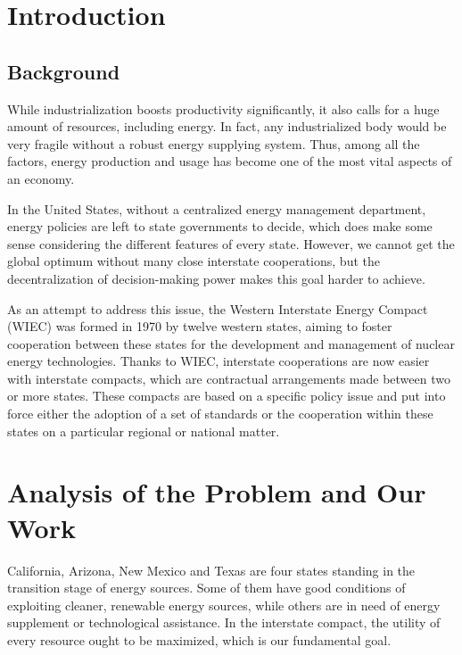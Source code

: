 \documentclass{mcmthesis}
\begin{document}
\section{Introduction}
\subsection{Background}
While industrialization boosts productivity significantly, it also calls for a huge amount of resources, including energy.
In fact, any industrialized body would be very fragile without a robust energy supplying system.
Thus, among all the factors, energy production and usage has become one of the most vital aspects of an economy.

In the United States, without a centralized energy management department, energy policies are left to state governments to decide, which does make some sense considering the different features of every state.
However, we cannot get the global optimum without many close interstate cooperations, but the decentralization of decision-making power makes this goal harder to achieve.

As an attempt to address this issue, the Western Interstate Energy Compact (WIEC) was formed in 1970 by twelve western states, aiming to foster cooperation between these states for the development and management of nuclear energy technologies.
Thanks to WIEC, interstate cooperations are now easier with interstate compacts, which are contractual arrangements made between two or more states. These compacts are based on a specific policy issue and put into force either the adoption of a set of standards or the cooperation within these states on a particular regional or national matter.


\section{Analysis of the Problem and Our Work}
California, Arizona, New Mexico and Texas are four states standing in the transition stage of energy sources. Some of them have good conditions of exploiting cleaner, renewable energy sources, while others are in need of energy supplement or technological assistance. In the interstate compact, the utility of every resource ought to be maximized, which is our fundamental goal. 
\end{document}
